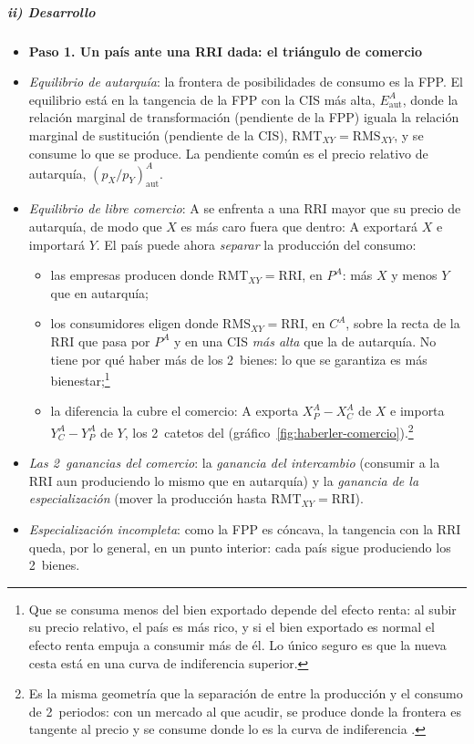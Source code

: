 \documentclass[11pt]{article}
\begin{document}
\subparagraph{ii) Desarrollo}

\begin{itemize}
\item[] \textbf{Paso 1. Un país ante una RRI dada: el triángulo de comercio}

\item \emph{Equilibrio de autarquía}: la frontera de posibilidades de consumo es la FPP. El equilibrio está en la tangencia de la FPP con la CIS más alta, $E^A_{\mathrm{aut}}$, donde la relación marginal de transformación (pendiente de la FPP) iguala la relación marginal de sustitución (pendiente de la CIS), $\mathrm{RMT}_{XY}=\mathrm{RMS}_{XY}$, y se consume lo que se produce. La pendiente común es el precio relativo de autarquía, $(p_X/p_Y)^A_{\mathrm{aut}}$.
\item \emph{Equilibrio de libre comercio}: A se enfrenta a una RRI mayor que su precio de autarquía, de modo que $X$ es más caro fuera que dentro: A exportará $X$ e importará $Y$. El país puede ahora \emph{separar} la producción del consumo:
  \begin{itemize}
  \item las empresas producen donde $\mathrm{RMT}_{XY}=\mathrm{RRI}$, en $P^A$: más $X$ y menos $Y$ que en autarquía;
  \item los consumidores eligen donde $\mathrm{RMS}_{XY}=\mathrm{RRI}$, en $C^A$, sobre la recta de la RRI que pasa por $P^A$ y en una CIS \emph{más alta} que la de autarquía. No tiene por qué haber más de los 2~bienes: lo que se garantiza es más bienestar;\footnote{Que se consuma menos del bien exportado depende del efecto renta: al subir su precio relativo, el país es más rico, y si el bien exportado es normal el efecto renta empuja a consumir más de él. Lo único seguro es que la nueva cesta está en una curva de indiferencia superior.}
  \item la diferencia la cubre el comercio: A exporta $X^A_P-X^A_C$ de $X$ e importa $Y^A_C-Y^A_P$ de $Y$, los 2~catetos del  (gráfico~\ref{fig:haberler-comercio}).\footnote{Es la misma geometría que la separación de  entre la producción y el consumo de 2~periodos: con un mercado al que acudir, se produce donde la frontera es tangente al precio y se consume donde lo es la curva de indiferencia .}
  \end{itemize}
\item \emph{Las 2~ganancias del comercio}: la \emph{ganancia del intercambio} (consumir a la RRI aun produciendo lo mismo que en autarquía) y la \emph{ganancia de la especialización} (mover la producción hasta $\mathrm{RMT}_{XY}=\mathrm{RRI}$).
\item \emph{Especialización incompleta}: como la FPP es cóncava, la tangencia con la RRI queda, por lo general, en un punto interior: cada país sigue produciendo los 2~bienes.
\end{itemize}
\end{document}
